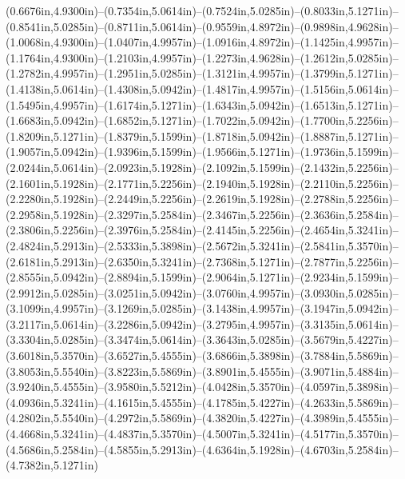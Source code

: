 (0.6676in,4.9300in)--(0.7354in,5.0614in)--(0.7524in,5.0285in)--(0.8033in,5.1271in)--(0.8541in,5.0285in)--(0.8711in,5.0614in)--(0.9559in,4.8972in)--(0.9898in,4.9628in)--(1.0068in,4.9300in)--(1.0407in,4.9957in)--(1.0916in,4.8972in)--(1.1425in,4.9957in)--(1.1764in,4.9300in)--(1.2103in,4.9957in)--(1.2273in,4.9628in)--(1.2612in,5.0285in)--(1.2782in,4.9957in)--(1.2951in,5.0285in)--(1.3121in,4.9957in)--(1.3799in,5.1271in)--(1.4138in,5.0614in)--(1.4308in,5.0942in)--(1.4817in,4.9957in)--(1.5156in,5.0614in)--(1.5495in,4.9957in)--(1.6174in,5.1271in)--(1.6343in,5.0942in)--(1.6513in,5.1271in)--(1.6683in,5.0942in)--(1.6852in,5.1271in)--(1.7022in,5.0942in)--(1.7700in,5.2256in)--(1.8209in,5.1271in)--(1.8379in,5.1599in)--(1.8718in,5.0942in)--(1.8887in,5.1271in)--(1.9057in,5.0942in)--(1.9396in,5.1599in)--(1.9566in,5.1271in)--(1.9736in,5.1599in)--(2.0244in,5.0614in)--(2.0923in,5.1928in)--(2.1092in,5.1599in)--(2.1432in,5.2256in)--(2.1601in,5.1928in)--(2.1771in,5.2256in)--(2.1940in,5.1928in)--(2.2110in,5.2256in)--(2.2280in,5.1928in)--(2.2449in,5.2256in)--(2.2619in,5.1928in)--(2.2788in,5.2256in)--(2.2958in,5.1928in)--(2.3297in,5.2584in)--(2.3467in,5.2256in)--(2.3636in,5.2584in)--(2.3806in,5.2256in)--(2.3976in,5.2584in)--(2.4145in,5.2256in)--(2.4654in,5.3241in)--(2.4824in,5.2913in)--(2.5333in,5.3898in)--(2.5672in,5.3241in)--(2.5841in,5.3570in)--(2.6181in,5.2913in)--(2.6350in,5.3241in)--(2.7368in,5.1271in)--(2.7877in,5.2256in)--(2.8555in,5.0942in)--(2.8894in,5.1599in)--(2.9064in,5.1271in)--(2.9234in,5.1599in)--(2.9912in,5.0285in)--(3.0251in,5.0942in)--(3.0760in,4.9957in)--(3.0930in,5.0285in)--(3.1099in,4.9957in)--(3.1269in,5.0285in)--(3.1438in,4.9957in)--(3.1947in,5.0942in)--(3.2117in,5.0614in)--(3.2286in,5.0942in)--(3.2795in,4.9957in)--(3.3135in,5.0614in)--(3.3304in,5.0285in)--(3.3474in,5.0614in)--(3.3643in,5.0285in)--(3.5679in,5.4227in)--(3.6018in,5.3570in)--(3.6527in,5.4555in)--(3.6866in,5.3898in)--(3.7884in,5.5869in)--(3.8053in,5.5540in)--(3.8223in,5.5869in)--(3.8901in,5.4555in)--(3.9071in,5.4884in)--(3.9240in,5.4555in)--(3.9580in,5.5212in)--(4.0428in,5.3570in)--(4.0597in,5.3898in)--(4.0936in,5.3241in)--(4.1615in,5.4555in)--(4.1785in,5.4227in)--(4.2633in,5.5869in)--(4.2802in,5.5540in)--(4.2972in,5.5869in)--(4.3820in,5.4227in)--(4.3989in,5.4555in)--(4.4668in,5.3241in)--(4.4837in,5.3570in)--(4.5007in,5.3241in)--(4.5177in,5.3570in)--(4.5686in,5.2584in)--(4.5855in,5.2913in)--(4.6364in,5.1928in)--(4.6703in,5.2584in)--(4.7382in,5.1271in)

